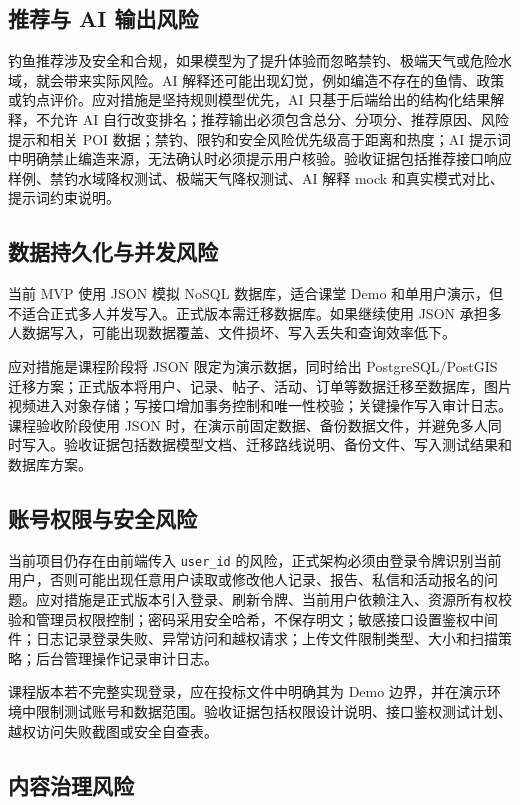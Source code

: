 \subsection{推荐与 AI 输出风险}

钓鱼推荐涉及安全和合规，如果模型为了提升体验而忽略禁钓、极端天气或危险水域，就会带来实际风险。AI 解释还可能出现幻觉，例如编造不存在的鱼情、政策或钓点评价。应对措施是坚持规则模型优先，AI 只基于后端给出的结构化结果解释，不允许 AI 自行改变排名；推荐输出必须包含总分、分项分、推荐原因、风险提示和相关 POI 数据；禁钓、限钓和安全风险优先级高于距离和热度；AI 提示词中明确禁止编造来源，无法确认时必须提示用户核验。验收证据包括推荐接口响应样例、禁钓水域降权测试、极端天气降权测试、AI 解释 mock 和真实模式对比、提示词约束说明。

\subsection{数据持久化与并发风险}

当前 MVP 使用 JSON 模拟 NoSQL 数据库，适合课堂 Demo 和单用户演示，但不适合正式多人并发写入。正式版本需迁移数据库。如果继续使用 JSON 承担多人数据写入，可能出现数据覆盖、文件损坏、写入丢失和查询效率低下。

应对措施是课程阶段将 JSON 限定为演示数据，同时给出 PostgreSQL/PostGIS 迁移方案；正式版本将用户、记录、帖子、活动、订单等数据迁移至数据库，图片视频进入对象存储；写接口增加事务控制和唯一性校验；关键操作写入审计日志。课程验收阶段使用 JSON 时，在演示前固定数据、备份数据文件，并避免多人同时写入。验收证据包括数据模型文档、迁移路线说明、备份文件、写入测试结果和数据库方案。

\subsection{账号权限与安全风险}

当前项目仍存在由前端传入 \texttt{user\_id} 的风险，正式架构必须由登录令牌识别当前用户，否则可能出现任意用户读取或修改他人记录、报告、私信和活动报名的问题。应对措施是正式版本引入登录、刷新令牌、当前用户依赖注入、资源所有权校验和管理员权限控制；密码采用安全哈希，不保存明文；敏感接口设置鉴权中间件；日志记录登录失败、异常访问和越权请求；上传文件限制类型、大小和扫描策略；后台管理操作记录审计日志。

课程版本若不完整实现登录，应在投标文件中明确其为 Demo 边界，并在演示环境中限制测试账号和数据范围。验收证据包括权限设计说明、接口鉴权测试计划、越权访问失败截图或安全自查表。

\subsection{内容治理风险}

